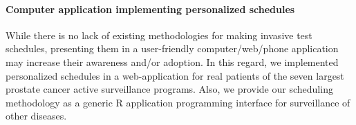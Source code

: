 \paragraph{Computer application implementing personalized schedules} While there is no lack of existing methodologies for making invasive test schedules, presenting them in a user-friendly computer/web/phone application may increase their awareness and/or adoption. In this regard, we implemented personalized schedules in a web-application for real patients of the seven largest prostate cancer active surveillance programs. Also, we provide our scheduling methodology as a generic R application programming interface for surveillance of other diseases.